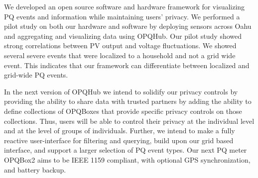 We developed an open source software and hardware framework for visualizing PQ events and information while maintaining users’ privacy. We performed a pilot study on both our hardware and software by deploying sensors across Oahu and aggregating and visualizing data using OPQHub. Our pilot study showed strong correlations between PV output and voltage fluctuations. We showed several severe events that were localized to a household and not a grid wide event. This indicates that our framework can differentiate between localized and grid-wide PQ events.

In the next version of OPQHub we intend to solidify our privacy controls by providing the ability to share data with trusted partners by adding the ability to define collections of OPQBoxes that provide specific privacy controls on those collections. Thus, users will be able to control their privacy at the individual level and at the level of groups of individuals.  Further, we intend to make a fully reactive user-interface for filtering and querying, build upon our grid based interface, and support a larger selection of PQ event types. Our next PQ meter OPQBox2 aims to be IEEE 1159 compliant, with optional GPS synchronization, and battery backup. 

